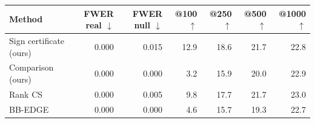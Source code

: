 \begin{tabular}{lrrrrrr}
\toprule
Method & FWER real $\downarrow$ & FWER null $\downarrow$ & @100 $\uparrow$ & @250 $\uparrow$ & @500 $\uparrow$ & @1000 $\uparrow$ \\
\midrule
Sign certificate (ours) & 0.000 & 0.015 & 12.9 & 18.6 & 21.7 & 22.8 \\
Comparison (ours) & 0.000 & 0.000 & 3.2 & 15.9 & 20.0 & 22.9 \\
Rank CS & 0.000 & 0.005 & 9.8 & 17.7 & 21.7 & 23.0 \\
BB-EDGE & 0.000 & 0.000 & 4.6 & 15.7 & 19.3 & 22.7 \\
\bottomrule
\end{tabular}
